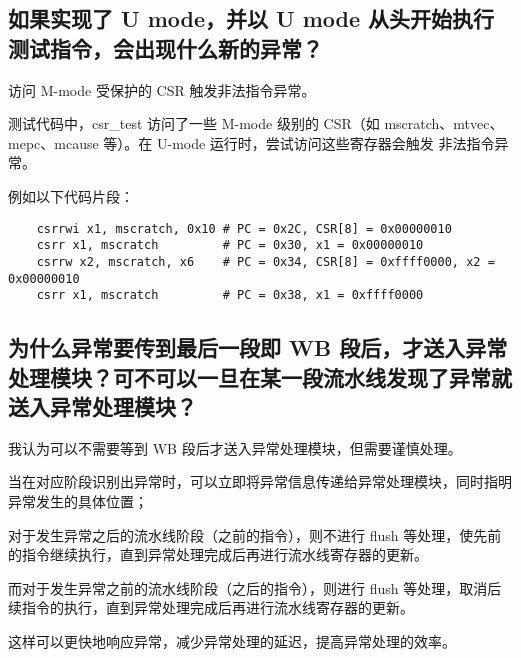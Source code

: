 \documentclass{article}
\begin{document}
\subsection{如果实现了 U mode，并以 U mode 从头开始执行测试指令，会出现什么新的异常？}
访问 M-mode 受保护的 CSR 触发非法指令异常。\par
测试代码中，csr\_test 访问了一些 M-mode 级别的 CSR（如 mscratch、mtvec、mepc、mcause 等）。在 U-mode 运行时，尝试访问这些寄存器会触发 非法指令异常。\par
例如以下代码片段：\par
\begin{verbatim}
    csrrwi x1, mscratch, 0x10 # PC = 0x2C, CSR[8] = 0x00000010
    csrr x1, mscratch         # PC = 0x30, x1 = 0x00000010
    csrrw x2, mscratch, x6    # PC = 0x34, CSR[8] = 0xffff0000, x2 = 0x00000010
    csrr x1, mscratch         # PC = 0x38, x1 = 0xffff0000
\end{verbatim}


\subsection{为什么异常要传到最后一段即 WB 段后，才送入异常处理模块？可不可以一旦在某一段流水线发现了异常就送入异常处理模块？}
我认为可以不需要等到 WB 段后才送入异常处理模块，但需要谨慎处理。\par
当在对应阶段识别出异常时，可以立即将异常信息传递给异常处理模块，同时指明异常发生的具体位置；\par
对于发生异常之后的流水线阶段（之前的指令），则不进行 flush 等处理，使先前的指令继续执行，直到异常处理完成后再进行流水线寄存器的更新。\par
而对于发生异常之前的流水线阶段（之后的指令），则进行 flush 等处理，取消后续指令的执行，直到异常处理完成后再进行流水线寄存器的更新。\par
这样可以更快地响应异常，减少异常处理的延迟，提高异常处理的效率。\par
\end{document}
